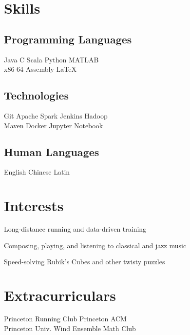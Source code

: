 \documentclass[]{deedy-resume-openfont}
\begin{document}
\begin{minipage}[t]{0.39\textwidth}
\section{Skills}
\subsection{Programming Languages}
Java \textbullet{} C \textbullet{} Scala \textbullet{} Python \textbullet{}  MATLAB \\
x86-64 Assembly \textbullet{} \LaTeX\ \\ 
\sectionsep

\subsection{Technologies}
Git \textbullet{} Apache Spark \textbullet{} Jenkins \textbullet{} Hadoop \\ Maven \textbullet{} Docker \textbullet{} Jupyter Notebook
\sectionsep

\subsection{Human Languages}
English \textbullet{} Chinese \textbullet{} Latin


\section{Interests}
\vspace{\topsep}
\begin{tightemize}
\item Long-distance running and data-driven training
\item Composing, playing, and listening to classical and jazz music
\item Speed-solving Rubik's Cubes and other twisty puzzles
\end{tightemize}


\section{Extracurriculars}
Princeton Running Club \textbullet{} Princeton ACM \\
Princeton Univ. Wind Ensemble \textbullet{} Math Club

%
%

\end{minipage} 
\end{document}
